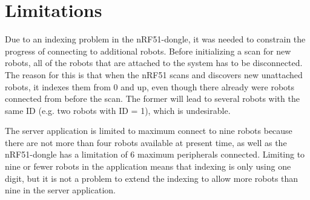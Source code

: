 \section{Limitations}
\label{secr:limitations}
Due to an indexing problem in the nRF51-dongle, it was needed to constrain the progress of connecting to additional robots. Before initializing a scan for new robots, all of the robots that are attached to the system has to be disconnected. The reason for this is that when the nRF51 scans and discovers new unattached robots, it indexes them from 0 and up, even though there already were robots connected from before the scan. The former will lead to several robots with the same ID (e.g. two robots with ID = 1), which is undesirable.

The server application is limited to maximum connect to nine robots because there are not more than four robots available at present time, as well as the nRF51-dongle has a limitation of 6 maximum peripherals connected. Limiting to nine or fewer robots in the application means that indexing is only using one digit, but it is not a problem to extend the indexing to allow more robots than nine in the server application.